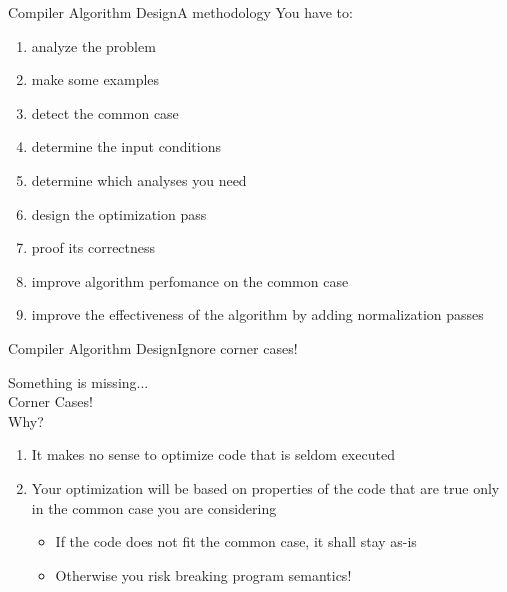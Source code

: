 \begin{frame}{Compiler Algorithm Design}{A methodology}
You have to:

\begin{enumerate}
\item analyze the problem
\item make some examples
\item detect the common case
\item determine the \alert{input conditions}
\item determine which \alert{analyses} you need
\item design the \alert{optimization} pass
\item proof its \alert{correctness}
\item improve algorithm perfomance on the common case
\item improve the effectiveness of the algorithm by adding
      \alert{normalization passes}
\end{enumerate}
\end{frame}


\begin{frame}{Compiler Algorithm Design}{Ignore corner cases!}
\begin{center}
Something is missing...\\
\bigskip
{\Large Corner Cases!}\\
\bigskip
Why?\\
\end{center}
\begin{enumerate}
\item It makes no sense to optimize code that is seldom executed
\item Your optimization will be based on \alert{properties of the code that are true only in the common case you are considering}
\begin{itemize}
\item If the code does not fit the common case, it shall stay as-is
\item Otherwise you \alert{risk breaking program semantics}!
\end{itemize}
\end{enumerate}
\end{frame}

